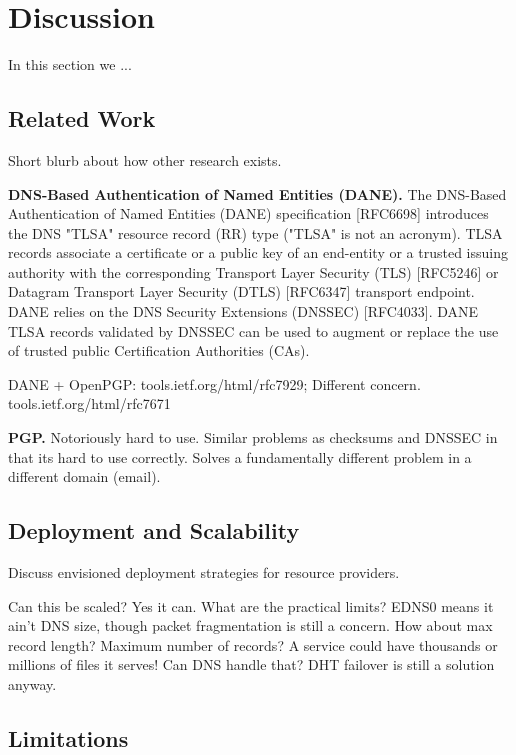 \section{Discussion} \label{sec:discussion}

In this section we ...

\subsection{Related Work}

Short blurb about how other research exists.

\textbf{DNS-Based Authentication of Named Entities (DANE).}    The DNS-Based
Authentication of Named Entities (DANE) specification [RFC6698] introduces the
DNS "TLSA" resource record (RR) type ("TLSA" is not an acronym). TLSA records
associate a certificate or a public key of an end-entity or a trusted issuing
authority with the corresponding Transport Layer Security (TLS) [RFC5246] or
Datagram Transport Layer Security (DTLS) [RFC6347] transport endpoint. DANE
relies on the DNS Security Extensions (DNSSEC) [RFC4033]. DANE TLSA records
validated by DNSSEC can be used to augment or replace the use of trusted public
Certification Authorities (CAs).

DANE + OpenPGP: tools.ietf.org/html/rfc7929; Different concern.
tools.ietf.org/html/rfc7671

\textbf{PGP.}   Notoriously hard to use. Similar problems as checksums and
DNSSEC in that its hard to use correctly. Solves a fundamentally different
problem in a different domain (email).

\subsection{Deployment and Scalability}

Discuss envisioned deployment strategies for resource providers.

Can this be scaled? Yes it can. What are the practical limits? EDNS0 means it
ain't DNS size, though packet fragmentation is still a concern. How about max
record length? Maximum number of records? A service could have thousands or
millions of files it serves! Can DNS handle that? DHT failover is still a
solution anyway.

\subsection{Limitations}


